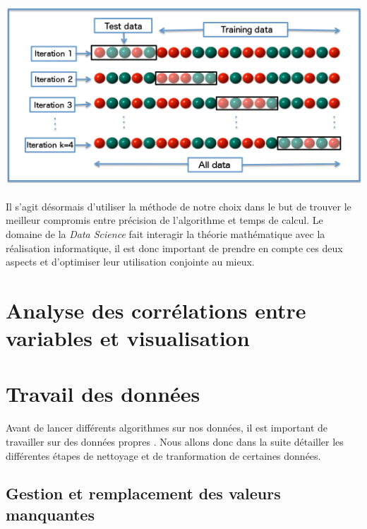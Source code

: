 \documentclass[14pt, openany]{article}
\begin{document}
\paragraph{}
\includegraphics[width=17cm]{Images/k_fold.jpg}
\begin{center}
\label{fig1}
\end{center}
\paragraph{}
Il s'agit désormais d'utiliser la méthode de notre choix dans le but de trouver le meilleur compromis entre précision de l'algorithme et temps de calcul. Le domaine de la \textit{Data Science} fait interagir la théorie mathématique avec la réalisation informatique, il est donc important de prendre en compte ces deux aspects et d'optimiser leur utilisation conjointe au mieux.
\section{Analyse des corrélations entre variables et visualisation}

\newpage
\section{Travail des données}
\paragraph{}
Avant de lancer différents algorithmes sur nos données, il est important de travailler sur des données \og propres \fg{}. Nous allons donc dans la suite détailler les différentes étapes de nettoyage et de tranformation de certaines données.
\subsection{Gestion et remplacement des valeurs manquantes}
\end{document}
